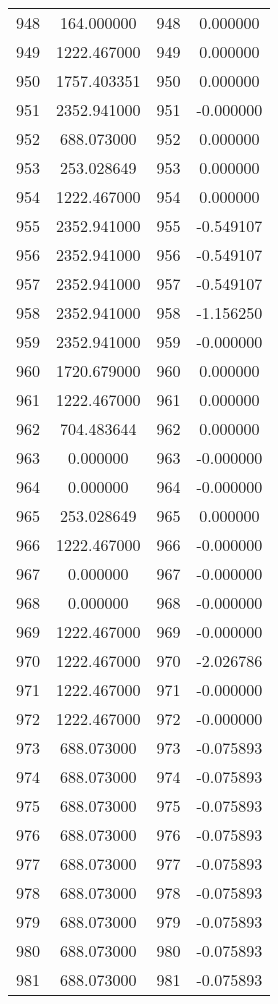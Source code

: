 \documentclass[12pt]{article}
\begin{document}
\begin{longtable}{@{}cccc@{}}
948 & 164.000000 & 948 & 0.000000 \\
949 & 1222.467000 & 949 & 0.000000 \\
950 & 1757.403351 & 950 & 0.000000 \\
951 & 2352.941000 & 951 & -0.000000 \\
952 & 688.073000 & 952 & 0.000000 \\
953 & 253.028649 & 953 & 0.000000 \\
954 & 1222.467000 & 954 & 0.000000 \\
955 & 2352.941000 & 955 & -0.549107 \\
956 & 2352.941000 & 956 & -0.549107 \\
957 & 2352.941000 & 957 & -0.549107 \\
958 & 2352.941000 & 958 & -1.156250 \\
959 & 2352.941000 & 959 & -0.000000 \\
960 & 1720.679000 & 960 & 0.000000 \\
961 & 1222.467000 & 961 & 0.000000 \\
962 & 704.483644 & 962 & 0.000000 \\
963 & 0.000000 & 963 & -0.000000 \\
964 & 0.000000 & 964 & -0.000000 \\
965 & 253.028649 & 965 & 0.000000 \\
966 & 1222.467000 & 966 & -0.000000 \\
967 & 0.000000 & 967 & -0.000000 \\
968 & 0.000000 & 968 & -0.000000 \\
969 & 1222.467000 & 969 & -0.000000 \\
970 & 1222.467000 & 970 & -2.026786 \\
971 & 1222.467000 & 971 & -0.000000 \\
972 & 1222.467000 & 972 & -0.000000 \\
973 & 688.073000 & 973 & -0.075893 \\
974 & 688.073000 & 974 & -0.075893 \\
975 & 688.073000 & 975 & -0.075893 \\
976 & 688.073000 & 976 & -0.075893 \\
977 & 688.073000 & 977 & -0.075893 \\
978 & 688.073000 & 978 & -0.075893 \\
979 & 688.073000 & 979 & -0.075893 \\
980 & 688.073000 & 980 & -0.075893 \\
981 & 688.073000 & 981 & -0.075893 \\

\end{longtable}
\end{document}
